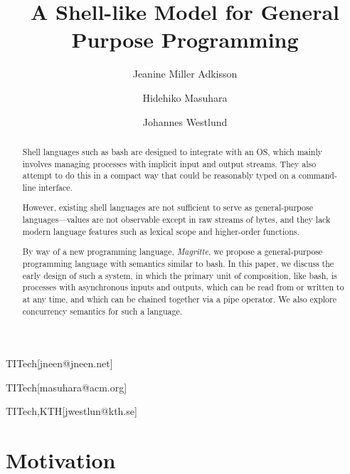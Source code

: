 \documentclass[english,preprint,JIP,uplatex]{ipsj}
\begin{document}
\title{A Shell-like Model for General Purpose Programming}



\author{Jeanine Miller Adkisson}{TITech}[jneen@jneen.net]
\author{Hidehiko Masuhara}{TITech}[masuhara@acm.org]
\author{Johannes Westlund}{TITech,KTH}[jwestlun@kth.se]



\begin{abstract}
Shell languages such as bash are designed to integrate with an OS, which mainly involves managing processes with implicit input and output streams. They also attempt to do this in a compact way that could be reasonably typed on a command-line interface.

However, existing shell languages are not sufficient to serve as general-purpose languages---values are not observable except in raw streams of bytes, and they lack modern language features such as lexical scope and higher-order functions.

By way of a new programming language, \emph{Magritte}, we propose a general-purpose programming language with semantics similar to bash. In this paper, we discuss the early design of such a system, in which the primary unit of composition, like bash, is processes with asynchronous inputs and outputs, which can be read from or written to at any time, and which can be chained together via a pipe operator. We also explore concurrency semantics for such a language.
\end{abstract}

\maketitle

\section{Motivation}\label{motivation}
\end{document}
